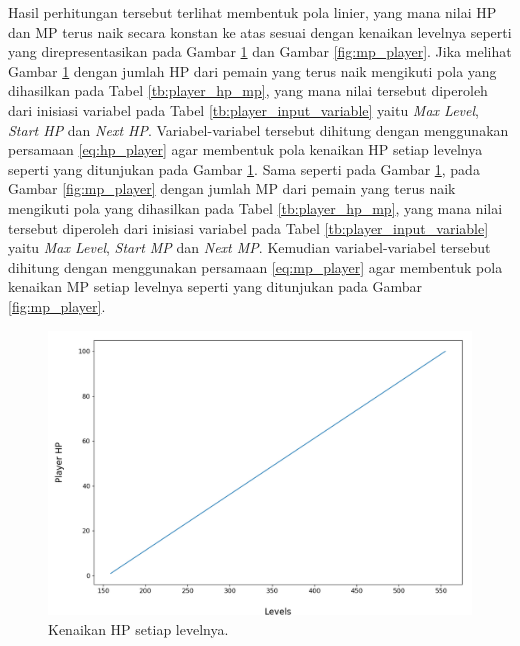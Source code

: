 Hasil perhitungan tersebut terlihat membentuk pola linier, yang mana nilai HP dan MP terus naik secara konstan ke atas sesuai dengan kenaikan levelnya seperti yang direpresentasikan pada Gambar \ref{fig:hp_player} dan Gambar \ref{fig:mp_player}. Jika melihat Gambar \ref{fig:hp_player} dengan jumlah HP dari pemain yang terus naik mengikuti pola yang dihasilkan pada Tabel \ref{tb:player_hp_mp}, yang mana nilai tersebut diperoleh dari inisiasi variabel pada Tabel \ref{tb:player_input_variable} yaitu \textit{Max Level}, \textit{Start HP} dan \textit{Next HP}. Variabel-variabel tersebut dihitung dengan menggunakan persamaan \ref{eq:hp_player} agar membentuk pola kenaikan HP setiap levelnya seperti yang ditunjukan pada Gambar \ref{fig:hp_player}. Sama seperti pada Gambar \ref{fig:hp_player}, pada Gambar \ref{fig:mp_player} dengan jumlah MP dari pemain yang terus naik mengikuti pola yang dihasilkan pada Tabel \ref{tb:player_hp_mp}, yang mana nilai tersebut diperoleh dari inisiasi variabel pada Tabel \ref{tb:player_input_variable} yaitu \textit{Max Level}, \textit{Start MP} dan \textit{Next MP}. Kemudian variabel-variabel tersebut dihitung dengan menggunakan persamaan \ref{eq:mp_player} agar membentuk pola kenaikan MP setiap levelnya seperti yang ditunjukan pada Gambar \ref{fig:mp_player}. 
\vspace{1ex}

\begin{figure} [!h] \centering
	\includegraphics[scale=0.44]{img/PlayerHpDistrib.png}
	\caption{Kenaikan HP setiap levelnya.}
	\label{fig:hp_player}
\end{figure}

